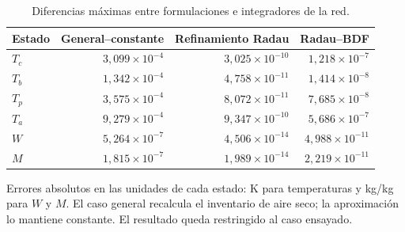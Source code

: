 \begin{table}[htbp]
\centering
\caption{Diferencias máximas entre formulaciones e integradores de la red.}
\label{tab:res_red_comparacion}
\small
\setlength{\tabcolsep}{5pt}
\begin{tabular}{lrrr}
\toprule
Estado & General--constante & Refinamiento Radau & Radau--BDF \\
\midrule
$T_c$ & $3{,}099\times10^{-4}$ & $3{,}025\times10^{-10}$ & $1{,}218\times10^{-7}$ \\
$T_b$ & $1{,}342\times10^{-4}$ & $4{,}758\times10^{-11}$ & $1{,}414\times10^{-8}$ \\
$T_p$ & $3{,}575\times10^{-4}$ & $8{,}072\times10^{-11}$ & $7{,}685\times10^{-8}$ \\
$T_a$ & $9{,}279\times10^{-4}$ & $9{,}347\times10^{-10}$ & $5{,}686\times10^{-7}$ \\
$W$ & $5{,}264\times10^{-7}$ & $4{,}506\times10^{-14}$ & $4{,}988\times10^{-11}$ \\
$M$ & $1{,}815\times10^{-7}$ & $1{,}989\times10^{-14}$ & $2{,}219\times10^{-11}$ \\
\bottomrule
\end{tabular}
\par\vspace{3pt}
\begin{minipage}{0.98\textwidth}\footnotesize
Errores absolutos en las unidades de cada estado: K para temperaturas y kg/kg para $W$ y $M$. El caso general recalcula el inventario de aire seco; la aproximación lo mantiene constante. El resultado queda restringido al caso ensayado.
\end{minipage}
\end{table}

